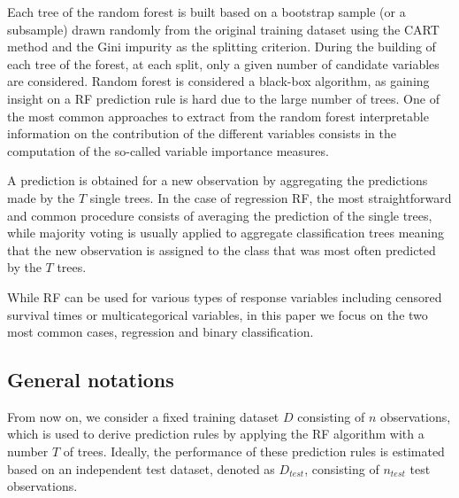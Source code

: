 \documentclass[paper=a4
               ,12pt
               ,DIV=12
               ,parskip=half
               ,titlepage=on
               ,headinclude 
               ,footinclude
               ,headsepline
               ,footsepline         %
               ,ilines 
               ]{scrartcl}
\begin{document}
Each tree of the random forest is built based on a bootstrap sample (or a subsample) drawn randomly from the original training dataset using the CART method and the Gini impurity 
\citep{Breiman1984} as the splitting criterion. During the building of each tree of the forest, at each split, only a given number of candidate variables are considered. 
Random forest is considered a black-box algorithm, as gaining insight on a RF prediction rule is hard due to the large number of trees. One of the most common approaches to extract from 
the random forest interpretable information on the contribution of the different variables consists in the computation of the so-called variable importance measures. 

A prediction is obtained for a new observation by aggregating the predictions made by the $T$ single trees. In the case of regression RF, the most straightforward and common procedure 
consists of averaging the prediction of the single trees, while majority voting is usually applied to aggregate classification trees meaning that the new observation is assigned to the 
class that was most often predicted by the $T$ trees. 







While RF can be used for various types of response variables including censored survival times or multicategorical variables, in this paper we focus on the two most common cases, regression and binary classification.

\subsection{General notations}
From now on, we consider a fixed training dataset $D$ consisting of $n$ observations, which is used to derive prediction rules by applying the RF algorithm with a number $T$ of trees.
Ideally, the performance of these prediction rules is estimated based on an independent test dataset, denoted as $D_{test}$, consisting of $n_{test}$ test observations.
\end{document}
